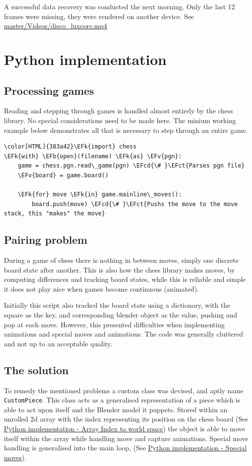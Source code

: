 \documentclass[11pt]{article}
\newcommand{\EFk}[1]{\textcolor{EFk}{#1}} %
\newcommand{\EFb}[1]{\textcolor{EFb}{#1}} %
\newcommand{\EFct}[1]{\textcolor{EFct}{#1}} %
\newcommand{\EFv}[1]{\textcolor{EFv}{#1}} %
\newcommand{\EFcd}[1]{\textcolor{EFcd}{#1}} %
\begin{document}
A successful data recovery was conducted the next morning. Only the last 12
frames were missing, they were rendered on another device. See
\href{https://github.com/Jake-Moss/blender-chess/blob/master/Videos/disco\_luxcore.mp4}{master/Videos/disco\_luxcore.mp4 }
\section{Python implementation}
\label{sec:orgd46f993}
\subsection{Processing games}
\label{sec:org8e86f52}
Reading and stepping through games is handled almost entirely by the chess
library. No special considerations need to be made here. The minium working
example below demonstrates all that is necessary to step through an entire game.

\begin{Code}
\begin{Verbatim}[]
\color[HTML]{383a42}\EFk{import} chess
\EFk{with} \EFb{open}(filename) \EFk{as} \EFv{pgn}:
    game = chess.pgn.read\_game(pgn) \EFcd{\# }\EFct{Parses pgn file}
    \EFv{board} = game.board()

    \EFk{for} move \EFk{in} game.mainline\_moves():
        board.push(move) \EFcd{\# }\EFct{Pushs the move to the move stack, this "makes" the move}
\end{Verbatim}
\end{Code}
\subsection{Pairing problem}
\label{sec:orgc1a7183}
During a game of chess there is nothing in between moves, simply one discrete
board state after another. This is also how the chess library makes moves, by
computing differences and tracking board states, while this is reliable and
simple it does not play nice when games become continuous (animated).

Initially this script also tracked the board state using a dictionary, with the
square as the key, and corresponding blender object as the value, pushing and
pop at each move. However, this presented difficulties when implementing
animations and special moves and animations. The code was generally cluttered
and not up to an acceptable quality.
\subsection{The solution}
\label{sec:orgc7287a9}
To remedy the mentioned problems a custom class was devised, and aptly name
\texttt{CustomPiece}. This class acts as a generalised representation of a piece which
is able to act upon itself and the Blender model it puppets. Stored within an
unrolled 2d array with the index representing its position on the chess board
(See \hyperref[sec:org789c6c4]{Python implementation - Array Index to world space}) the object is able to
move itself within the array while handling move and capture animations. Special
move handling is generalised into the main loop, (See \hyperref[sec:orgc8b627b]{Python implementation -
Special moves}).
\end{document}
